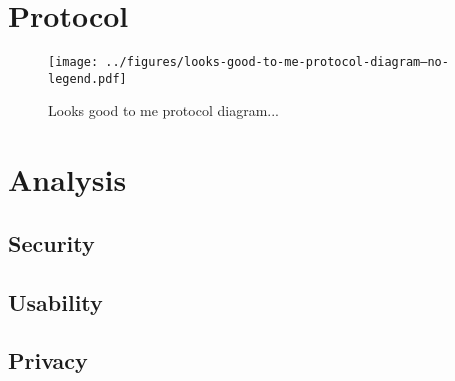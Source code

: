 \documentclass[12pt]{report}
\begin{document}
\section{Protocol}

\begin{figure}
\center
\texttt{[image: ../figures/looks-good-to-me-protocol-diagram--no-legend.pdf]}
\caption{Looks good to me protocol diagram...}
\label{protocol-diagram}
\end{figure}


\section{Analysis}
\subsection{Security}
\subsection{Usability}
\subsection{Privacy}
\end{document}
